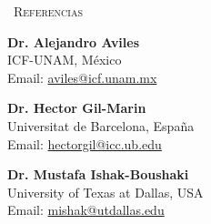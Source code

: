 \prefixmarker{}
\begin{rubric}{\faAddressBook\ \textsc{Referencias}}
\entry*[]%
\begin{multicols}{3}

\begin{minipage}{\linewidth}
\textbf{Dr. Alejandro Aviles} \\
ICF-UNAM, México \\
Email: \url{aviles@icf.unam.mx }
\end{minipage}

\begin{minipage}{\linewidth}
\textbf{Dr. Hector Gil-Marin} \\
Universitat de Barcelona, España \\
Email: \url{hectorgil@icc.ub.edu}
\end{minipage}

\begin{minipage}{\linewidth}
\textbf{Dr. Mustafa Ishak-Boushaki} \\
University of Texas at Dallas, USA \\
Email: \url{mishak@utdallas.edu}
\end{minipage}

\end{multicols}\par
\end{rubric}
